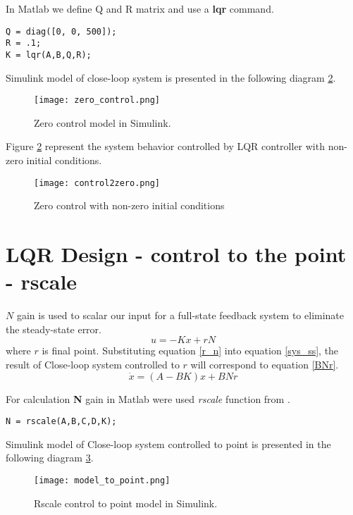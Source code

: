 In Matlab we define Q and R matrix and use a \textbf{lqr} command.
\begin{lstlisting}[frame=single]
Q = diag([0, 0, 500]);
R = .1;
K = lqr(A,B,Q,R);
\end{lstlisting}

Simulink model of close-loop system is presented in the following diagram
\ref{fig:zero_control}.

\begin{figure}[h]
    \centering
    \texttt{[image: zero\_control.png]}
    \caption{Zero control model in Simulink.}
    \label{fig:zero_control}
\end{figure}

Figure \ref{fig:zero_control} represent the system behavior controlled by
LQR controller with non-zero initial conditions.

\begin{figure}[h!]
    \centering
    \texttt{[image: control2zero.png]}
    \caption{Zero control with non-zero initial conditions}
    \label{fig:zero_control}
\end{figure}


\section{LQR Design - control to the point - rscale}

$N$ gain is used to scalar our input for a full-state feedback system to 
eliminate the steady-state error.
\begin{equation}\label{r_n}
    u = -Kx + rN
\end{equation} 
where $r$ is final point. Substituting equation \ref{r_n} into equation \ref{sys_ss}, the
result of Close-loop system controlled to $r$ will correspond to equation
\ref{BNr}.
\begin{equation}\label{BNr}
    \dot{x} = (A-BK)x + BNr
\end{equation}

For calculation \textbf{N} gain in Matlab were used \textit{rscale} function from
\cite{rscale}. 
\begin{lstlisting}[frame=single]
N = rscale(A,B,C,D,K);
\end{lstlisting}

Simulink model of Close-loop system controlled to point is presented in the
following diagram \ref{fig:model_to_point}.

\begin{figure}[hbt!]
    \centering
    \texttt{[image: model\_to\_point.png]}
    \caption{Rscale control to point model in Simulink.}
    \label{fig:model_to_point}
\end{figure}

